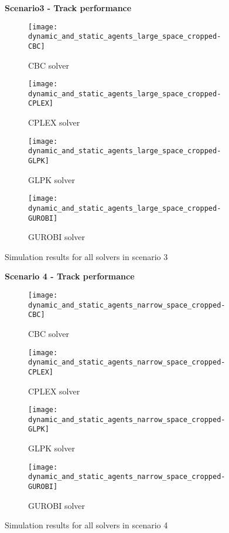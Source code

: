 \begin{figure}[H]
    \centering
    \textbf{Scenario3 - Track performance}\par \medskip
    \begin{subfigure}{0.49\textwidth}
        \centering
        \texttt{[image: dynamic\_and\_static\_agents\_large\_space\_cropped-CBC]}
        \caption{CBC solver}
    \end{subfigure}
    \begin{subfigure}{0.49\textwidth}
        \centering
        \texttt{[image: dynamic\_and\_static\_agents\_large\_space\_cropped-CPLEX]}
        \caption{CPLEX solver}
    \end{subfigure}
    \begin{subfigure}{0.49\textwidth}
        \centering
        \texttt{[image: dynamic\_and\_static\_agents\_large\_space\_cropped-GLPK]}
        \caption{GLPK solver}
    \end{subfigure}
    \begin{subfigure}{0.49\textwidth}
        \centering
        \texttt{[image: dynamic\_and\_static\_agents\_large\_space\_cropped-GUROBI]}
        \caption{GUROBI solver}
    \end{subfigure}
    \caption{Simulation results for all solvers in scenario 3}
	\label{fig:dynamic_and_static_agents_large_space_cropped}
\end{figure}

\begin{figure}[H]
    \centering
    \textbf{Scenario 4 - Track performance}\par \medskip
    \begin{subfigure}{0.49\textwidth}
        \centering
        \texttt{[image: dynamic\_and\_static\_agents\_narrow\_space\_cropped-CBC]}
        \caption{CBC solver}
    \end{subfigure}
    \begin{subfigure}{0.49\textwidth}
        \centering
        \texttt{[image: dynamic\_and\_static\_agents\_narrow\_space\_cropped-CPLEX]}
        \caption{CPLEX solver}
    \end{subfigure}
    \begin{subfigure}{0.49\textwidth}
        \centering
        \texttt{[image: dynamic\_and\_static\_agents\_narrow\_space\_cropped-GLPK]}
        \caption{GLPK solver}
    \end{subfigure}
    \begin{subfigure}{0.49\textwidth}
        \centering
        \texttt{[image: dynamic\_and\_static\_agents\_narrow\_space\_cropped-GUROBI]}
        \caption{GUROBI solver}
    \end{subfigure}
    \caption{Simulation results for all solvers in scenario 4}
	\label{fig:dynamic_and_static_agents_narrow_space_cropped}
\end{figure}

